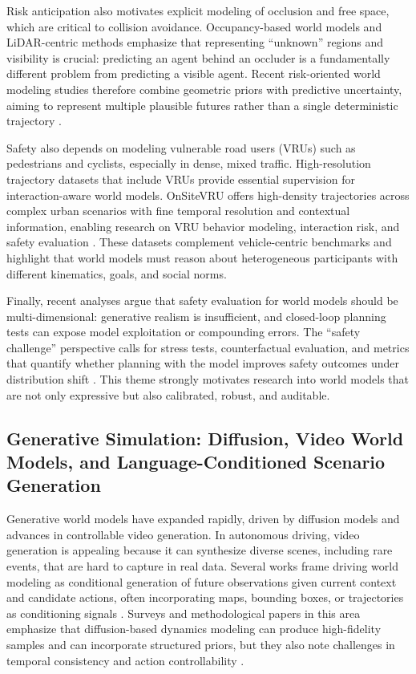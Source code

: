 Risk anticipation also motivates explicit modeling of occlusion and free space, which are critical to collision avoidance. Occupancy-based world models and LiDAR-centric methods emphasize that representing “unknown” regions and visibility is crucial: predicting an agent behind an occluder is a fundamentally different problem from predicting a visible agent. Recent risk-oriented world modeling studies therefore combine geometric priors with predictive uncertainty, aiming to represent multiple plausible futures rather than a single deterministic trajectory \cite{Guan2025,Bogdoll2025}.

Safety also depends on modeling vulnerable road users (VRUs) such as pedestrians and cyclists, especially in dense, mixed traffic. High-resolution trajectory datasets that include VRUs provide essential supervision for interaction-aware world models. OnSiteVRU offers high-density trajectories across complex urban scenarios with fine temporal resolution and contextual information, enabling research on VRU behavior modeling, interaction risk, and safety evaluation \cite{Yan2025}. These datasets complement vehicle-centric benchmarks and highlight that world models must reason about heterogeneous participants with different kinematics, goals, and social norms.

Finally, recent analyses argue that safety evaluation for world models should be multi-dimensional: generative realism is insufficient, and closed-loop planning tests can expose model exploitation or compounding errors. The “safety challenge” perspective calls for stress tests, counterfactual evaluation, and metrics that quantify whether planning with the model improves safety outcomes under distribution shift \cite{Baraldi2025}. This theme strongly motivates research into world models that are not only expressive but also calibrated, robust, and auditable.

\subsection{Generative Simulation: Diffusion, Video World Models, and Language-Conditioned Scenario Generation}

Generative world models have expanded rapidly, driven by diffusion models and advances in controllable video generation. In autonomous driving, video generation is appealing because it can synthesize diverse scenes, including rare events, that are hard to capture in real data. Several works frame driving world modeling as conditional generation of future observations given current context and candidate actions, often incorporating maps, bounding boxes, or trajectories as conditioning signals \cite{Fu2024,Chu2025}. Surveys and methodological papers in this area emphasize that diffusion-based dynamics modeling can produce high-fidelity samples and can incorporate structured priors, but they also note challenges in temporal consistency and action controllability \cite{Baraldi2025,Chen2025}.

